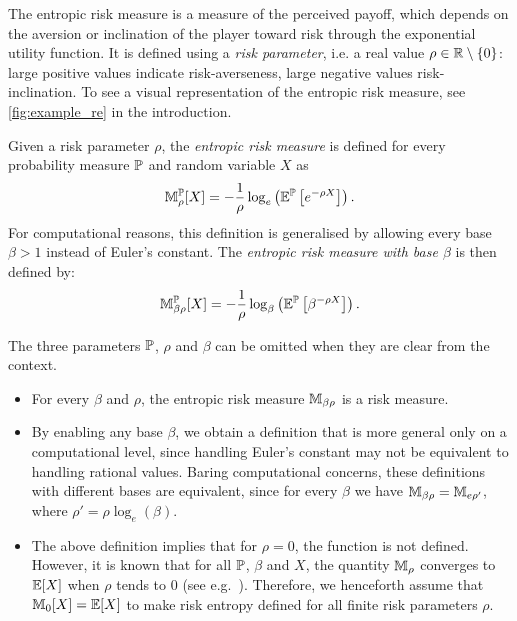 The entropic risk measure is a measure of the perceived payoff, which depends on the aversion or inclination of the player toward risk through the exponential utility function. 
It is defined using a \emph{risk parameter}, i.e. a real value $\rho\in\mathbb{R} \setminus \{0\}$: large positive values indicate risk-averseness, large negative values risk-inclination. To see a visual representation of the entropic risk measure, see \cref{fig:example_re} in the introduction.

\begin{definition}
Given a risk parameter $\rho$, the \emph{entropic risk measure} is defined for every probability measure $\mathbb{P}$ and random variable $X$ as
$$\mathbb{M}_{\rho}^{\mathbb{P}}[X] = -\frac{1}{\rho} \log_e \left( \mathbb{E}^{\mathbb{P}} \left[ e^{-\rho X}\right] \right).$$
For computational reasons, this definition is generalised by allowing every base $\beta > 1$ instead of Euler's constant. The \emph{entropic risk measure with base $\beta$} is then defined by: 
$$\mathbb{M}^{\mathbb{P}}_{\beta\rho}[X] = -\frac{1}{\rho} \log_\beta \left( \mathbb{E}^{\mathbb{P}} \left[ \beta^{-\rho X}\right] \right).$$
\end{definition}

The three parameters $\mathbb{P}$, $\rho$ and $\beta$ can be omitted when they are clear from the context.

\begin{remark}
\begin{itemize}
    \item For every $\beta$ and $\rho$, the entropic risk measure $\mathbb{M}_{\beta\rho}$ is a risk measure.

    \item By enabling any base $\beta$, we obtain a definition that is more general only on a computational level, since handling Euler's constant may not be equivalent to handling rational values.
    Baring computational concerns, these definitions with different bases are equivalent, since for every $\beta$ we have $\mathbb{M}_{\beta\rho} = \mathbb{M}_{e\rho'}$, where $\rho' = \rho \log_e(\beta)$.

    \item The above definition implies that for $\rho = 0$, the function is not defined.
    However, it is known that for all $\mathbb{P}$, $\beta$ and $X$, the quantity $\mathbb{M}_{\rho}$ converges to $\mathbb{E}[X]$ when $\rho$ tends to $0$ (see e.g.~\cite{PDM20}).
    Therefore, we henceforth assume that $\mathbb{M}_{0}[X] = \mathbb{E}[X]$ to make risk entropy defined for all finite risk parameters $\rho$.
\end{itemize}
\end{remark}

